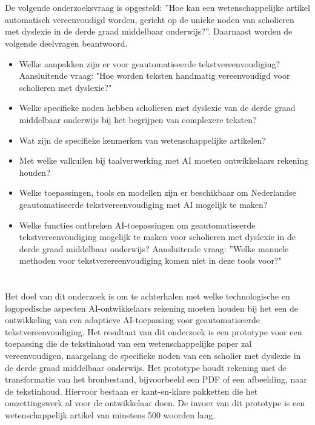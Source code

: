 \section{}%
\label{sec:onderzoeksvraag}

De volgende onderzoeksvraag is opgesteld: ”Hoe kan een wetenschappelijke artikel automatisch vereenvoudigd worden, gericht op de unieke noden van scholieren met dyslexie in de derde graad middelbaar onderwijs?”. Daarnaast worden de volgende deelvragen beantwoord.

\begin{itemize}
	\item Welke aanpakken zijn er voor geautomatiseerde tekstvereenvoudiging? Aansluitende vraag: "Hoe worden teksten handmatig vereenvoudigd voor scholieren met dyslexie?"
	\item Welke specifieke noden hebben scholieren met dyslexie van de derde graad middelbaar onderwijs bij het begrijpen van complexere teksten?
	\item Wat zijn de specifieke kenmerken van wetenschappelijke artikelen?
	\item Met welke valkuilen bij taalverwerking met AI moeten ontwikkelaars rekening houden?
	\item Welke toepassingen, tools en modellen zijn er beschikbaar om Nederlandse geautomatiseerde tekstvereenvoudiging met AI mogelijk te maken?
	\item Welke functies ontbreken AI-toepassingen om geautomatiseerde tekstvereenvoudiging mogelijk te maken voor scholieren met dyslexie in de derde graad middelbaar onderwijs? Aansluitende vraag: ”Welke manuele methoden voor tekstverereenvoudiging komen niet in deze tools voor?"
\end{itemize}


\section{}%
\label{sec:onderzoeksdoelstelling}


Het doel van dit onderzoek is om te achterhalen met welke technologische en logopedische aspecten AI-ontwikkelaars rekening moeten houden bij het een de ontwikkeling van een adaptieve AI-toepassing voor geautomatiseerde tekstvereenvoudiging. Het resultaat van dit onderzoek is een prototype voor een toepassing die de tekstinhoud van een wetenschappelijke paper zal vereenvoudigen, naargelang de specifieke noden van een scholier met dyslexie in de derde graad middelbaar onderwijs. Het prototype houdt rekening met de transformatie van het bronbestand, bijvoorbeeld een PDF of een afbeelding, naar de tekstinhoud. Hiervoor bestaan er kant-en-klare pakketten die het omzettingswerk al voor de ontwikkelaar doen. De invoer van dit prototype is een wetenschappelijk artikel van minstens 500 woorden lang.

